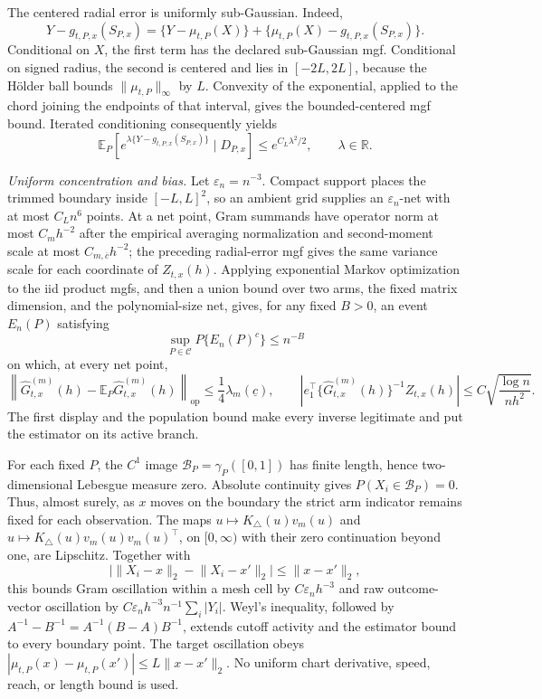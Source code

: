 The centered radial error is uniformly sub-Gaussian.  Indeed,
\[
Y-g_{t,P,x}(S_{P,x})=\{Y-\mu_{t,P}(X)\}+\{\mu_{t,P}(X)-g_{t,P,x}(S_{P,x})\}.
\]
Conditional on \(X\), the first term has the declared sub-Gaussian mgf.  Conditional on signed radius, the second is centered and lies in \([-2L,2L]\), because the H\"older ball bounds \(\lVert\mu_{t,P}\rVert_\infty\) by \(L\).  Convexity of the exponential, applied to the chord joining the endpoints of that interval, gives the bounded-centered mgf bound.  Iterated conditioning consequently yields
\[
\mathbb E_P\!\left[e^{\lambda\{Y-g_{t,P,x}(S_{P,x})\}}\mid D_{P,x}\right]
\leq e^{C_L\lambda^2/2},
\qquad \lambda\in\mathbb R.
\]

\emph{Uniform concentration and bias.}
Let \(\varepsilon_n=n^{-3}\).  Compact support places the trimmed boundary inside \([-L,L]^2\), so an ambient grid supplies an \(\varepsilon_n\)-net with at most \(C_Ln^6\) points.  At a net point, Gram summands have operator norm at most \(C_mh^{-2}\) after the empirical averaging normalization and second-moment scale at most \(C_{m,\overline c}h^{-2}\); the preceding radial-error mgf gives the same variance scale for each coordinate of \(Z_{t,x}(h)\).  Applying exponential Markov optimization to the iid product mgfs, and then a union bound over two arms, the fixed matrix dimension, and the polynomial-size net, gives, for any fixed \(B>0\), an event \(E_n(P)\) satisfying
\[
\sup_{P\in\mathcal C}P\{E_n(P)^c\}\leq n^{-B}
\]
on which, at every net point,
\[
\left\|\widehat G^{(m)}_{t,x}(h)-\mathbb E_P\widehat G^{(m)}_{t,x}(h)\right\|_{\mathrm{op}}
\leq\frac14\lambda_m(\underline c),
\qquad
\left|e_1^\top\{\widehat G^{(m)}_{t,x}(h)\}^{-1}Z_{t,x}(h)\right|
\leq C\sqrt{\frac{\log n}{nh^2}}.
\]
The first display and the population bound make every inverse legitimate and put the estimator on its active branch.

For each fixed \(P\), the \(C^1\) image \(\mathcal B_P=\gamma_P([0,1])\) has finite length, hence two-dimensional Lebesgue measure zero.  Absolute continuity gives \(P(X_i\in\mathcal B_P)=0\).  Thus, almost surely, as \(x\) moves on the boundary the strict arm indicator remains fixed for each observation.  The maps \(u\mapsto K_\triangle(u)v_m(u)\) and \(u\mapsto K_\triangle(u)v_m(u)v_m(u)^\top\), on \([0,\infty)\) with their zero continuation beyond one, are Lipschitz.  Together with
\[
\bigl|\lVert X_i-x\rVert_2-\lVert X_i-x'\rVert_2\bigr|\leq\lVert x-x'\rVert_2,
\]
this bounds Gram oscillation within a mesh cell by \(C\varepsilon_nh^{-3}\) and raw outcome-vector oscillation by \(C\varepsilon_nh^{-3}n^{-1}\sum_i|Y_i|\).  Weyl's inequality, followed by \(A^{-1}-B^{-1}=A^{-1}(B-A)B^{-1}\), extends cutoff activity and the estimator bound to every boundary point.  The target oscillation obeys \(|\mu_{t,P}(x)-\mu_{t,P}(x')|\leq L\lVert x-x'\rVert_2\).  No uniform chart derivative, speed, reach, or length bound is used.

